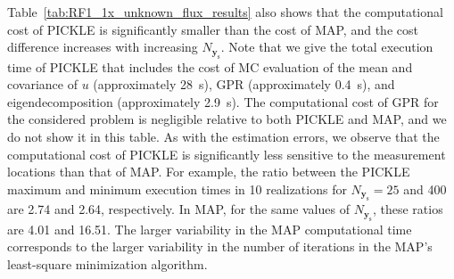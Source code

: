 \documentclass{agujournal2019}
\begin{document}
Table~\ref{tab:RF1_1x_unknown_flux_results} also shows that the computational cost of PICKLE is significantly smaller than the cost of MAP, and the cost difference increases with increasing $N_{\mathbf{y}_{\mathrm{s}}}$. %
Note that we give the total execution time of PICKLE that includes the cost of MC evaluation of the mean and covariance of $u$ (approximately 28~s), GPR (approximately 0.4~s), and eigendecomposition (approximately 2.9~s).
The computational cost of GPR for the considered problem is negligible relative to both PICKLE and MAP, and we do not show it in this table. 
As with the estimation errors, we observe that the computational cost of PICKLE is significantly less sensitive to the measurement locations than that of MAP.
For example, the ratio between the PICKLE maximum and minimum execution times in 10 realizations for  $N_{\mathbf{y}_{\mathrm{s}}}=25$ and 400 are 2.74 and 2.64, respectively.
In MAP, for the same values of  $N_{\mathbf{y}_{\mathrm{s}}}$, these ratios are 4.01 and 16.51. The larger variability in the MAP computational time corresponds to the larger variability in the number of iterations in the MAP's least-square minimization algorithm.      
\end{document}
